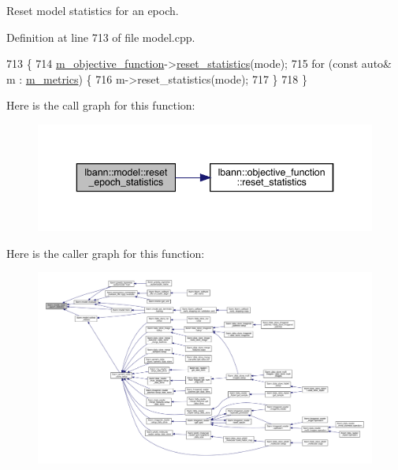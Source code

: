 Reset model statistics for an epoch. 

Definition at line 713 of file model.\+cpp.


\begin{DoxyCode}
713                                                       \{
714   \hyperlink{classlbann_1_1model_a24c50e7108dd7698671aed7df5b22e8b}{m\_objective\_function}->\hyperlink{classlbann_1_1objective__function_acf7a6c67e7a45a1fd03684ca897d6324}{reset\_statistics}(mode);
715   \textcolor{keywordflow}{for} (\textcolor{keyword}{const} \textcolor{keyword}{auto}& m : \hyperlink{classlbann_1_1model_ae75c9aafe9e5a93980cc1bbae986bc79}{m\_metrics}) \{
716     m->reset\_statistics(mode);
717   \}
718 \}
\end{DoxyCode}
Here is the call graph for this function\+:\nopagebreak
\begin{figure}[H]
\begin{center}
\leavevmode
\includegraphics[width=343pt]{classlbann_1_1model_a9c6e9c199ca0ae06b8cf7266971ab9c3_cgraph}
\end{center}
\end{figure}
Here is the caller graph for this function\+:\nopagebreak
\begin{figure}[H]
\begin{center}
\leavevmode
\includegraphics[width=350pt]{classlbann_1_1model_a9c6e9c199ca0ae06b8cf7266971ab9c3_icgraph}
\end{center}
\end{figure}
\mbox{\label{classlbann_1_1model_a5d188d75f53e0a4c6161500181b27c03}} 
